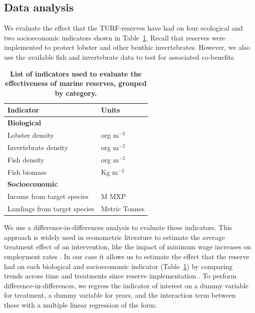 \documentclass[10pt,letterpaper]{article}
\begin{document}
\subsection*{Data analysis}

We evaluate the effect that the TURF-reserves have had on four ecological and two socioeconomic indicators shown in Table~\ref{table:indicators}. Recall that reserves were implemented to protect lobster and other benthic invertebrates. However, we also use the available fish and invertebrate data to test for associated co-benefits.

\begin{table}[!ht]

\caption{
{\bf List of indicators used to evaluate the effectiveness of marine reserves, grouped by category.}}
\centering
\begin{tabular}{l|l}
\hline
Indicator & Units\\
\hline
\multicolumn{2}{l}{\textbf{Biological}}\\
\hline
\hspace{1em}Lobster density & org $\mathrm{m}^{-2}$\\
\hline
\hspace{1em}Invertebrate density & org $\mathrm{m}^{-2}$\\
\hline
\hspace{1em}Fish density & org $\mathrm{m}^{-2}$\\
\hline
\hspace{1em}Fish biomass & Kg $\mathrm{m}^{-2}$\\
\hline
\multicolumn{2}{l}{\textbf{Socioeconomic}}\\
\hline
\hspace{1em}Income from target species & M MXP\\
\hline
\hspace{1em}Landings from target species & Metric Tonnes\\
\hline
\end{tabular}
\label{table:indicators}
\end{table}

We use a difference-in-differences analysis to evaluate these indicators. This approach is widely used in econometric literature to estimate the average treatment effect of an intervention, like the impact of minimum wage increases on employment rates \cite{card_1994}. In our case it allows us to estimate the effect that the reserve had on each biological and socioeconomic indicator (Table~\ref{table:indicators}) by comparing trends across time and treatments since reserve implementation \cite{moland_2013,Villasenor-Derbez_2018, kerr_2019}. To perform difference-in-differences, we regress the indicator of interest on a dummy variable for treatment, a dummy variable for years, and the interaction term between these with a multiple linear regression of the form:
\end{document}
